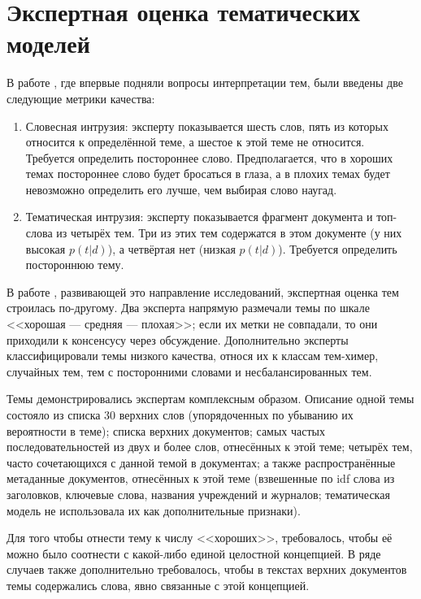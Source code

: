 \section{Экспертная оценка тематических моделей}

В работе \cite{rtl}, где впервые подняли вопросы интерпретации тем, были введены две следующие метрики качества:

\begin{enumerate}
\item{Словесная интрузия: эксперту показывается шесть слов, пять из которых относится к определённой теме, а шестое к этой теме не относится. Требуется определить постороннее слово. Предполагается, что в хороших темах постороннее слово будет бросаться в глаза, а в плохих темах будет невозможно определить его лучше, чем выбирая слово наугад.}
\item{Тематическая интрузия: эксперту показывается фрагмент документа и топ-слова из четырёх тем. Три из этих тем содержатся в этом документе (у них высокая $p(t|d)$), а четвёртая нет (низкая $p(t|d)$). Требуется определить постороннюю тему.}
\end{enumerate}

В работе \cite{mimno}, развивающей это направление исследований, экспертная оценка тем строилась по-другому. Два эксперта напрямую размечали темы по шкале <<хорошая --- средняя --- плохая>>; если их метки не совпадали, то они приходили к консенсусу через обсуждение. Дополнительно эксперты классифицировали темы низкого качества, относя их к классам тем-химер, случайных тем, тем с посторонними словами и несбалансированных тем.

Темы демонстрировались экспертам комплексным образом. Описание одной темы состояло из списка 30 верхних слов (упорядоченных по убыванию их вероятности в теме); списка верхних документов; самых частых последовательностей из двух и более слов, отнесённых к этой теме; четырёх тем, часто сочетающихся с данной темой в документах; а также распространённые метаданные документов, отнесённых к этой теме (взвешенные по idf слова из заголовков, ключевые слова, названия учреждений и журналов; тематическая модель не использовала их как дополнительные признаки).

Для того чтобы отнести тему к числу <<хороших>>, требовалось, чтобы её можно было соотнести с какой-либо единой целостной концепцией. В ряде случаев также дополнительно требовалось, чтобы в текстах верхних документов темы содержались слова, явно связанные с этой концепцией.

